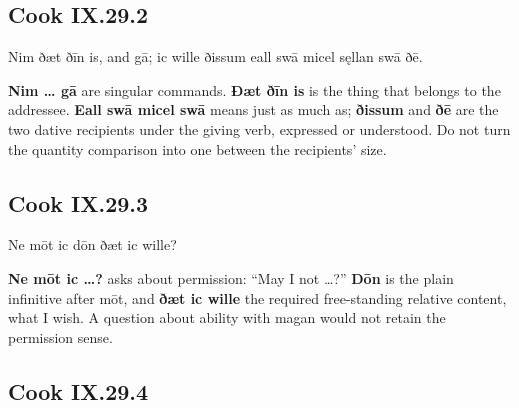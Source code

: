 \subsection*{Cook IX.29.2}

\par\begin{minipage}{\linewidth}\raggedright
Nim ðæt ðīn is, and gā; ic wille ðissum eall swā micel sęllan swā ðē.

\textbf{Nim … gā} are singular commands. \textbf{Ðæt ðīn is} is the thing that belongs to the addressee. \textbf{Eall swā micel swā} means just as much as; \textbf{ðissum} and \textbf{ðē} are the two dative recipients under the giving verb, expressed or understood. Do not turn the quantity comparison into one between the recipients’ size.

\end{minipage}\par\addvspace{4pt}

\subsection*{Cook IX.29.3}

\par\begin{minipage}{\linewidth}\raggedright
Ne mōt ic dōn ðæt ic wille?

\textbf{Ne mōt ic …?} asks about permission: “May I not …?” \textbf{Dōn} is the plain infinitive after mōt, and \textbf{ðæt ic wille} the required free-standing relative content, what I wish. A question about ability with magan would not retain the permission sense.

\end{minipage}\par\addvspace{4pt}

\subsection*{Cook IX.29.4}

